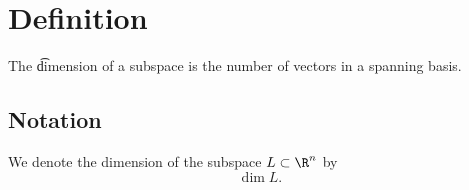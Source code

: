 
\section*{Definition}

The \t{dimension} of a subspace is the number of vectors in a spanning basis.

\subsection*{Notation}

We denote the dimension of the subspace $L \subset \R ^n$ by
  \[
\dim L.
  \]

\blankpage